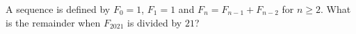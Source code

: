 A sequence is defined by $F_0=1$, $F_1=1$ and $F_n=F_{n-1}+F_{n-2}$ for $n\ge2$. What is the remainder when $F_{2021}$ is divided by $21$?
